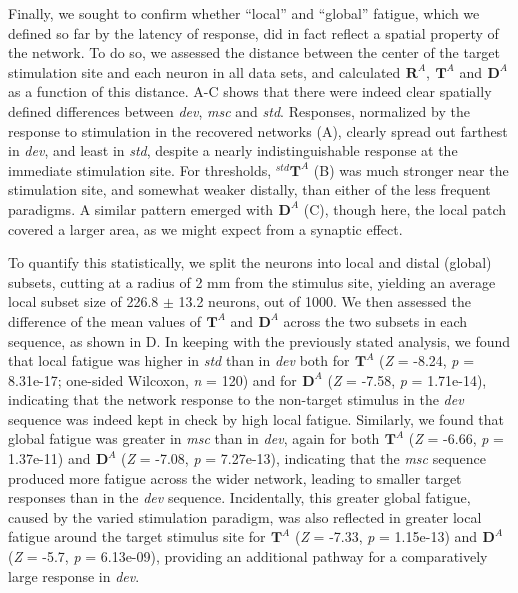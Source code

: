 \documentclass[9pt,lineno,onehalfspacing]{elife}
\newcommand{\dev}{\textit{dev}}
\newcommand{\msc}{\textit{msc}}
\newcommand{\std}{\textit{std}}
\newcommand{\R}[3][]{{}^{#1}_{}\boldsymbol R^{#2}_{#3}}
\newcommand{\T}[3][]{{}^{#1}_{}\boldsymbol T^{#2}_{#3}}
\newcommand{\D}[3][]{{}^{#1}_{}\boldsymbol D^{#2}_{#3}}
\begin{document}
Finally, we sought to confirm whether ``local'' and ``global'' fatigue, which we defined so far by the latency of response, did in fact reflect a spatial property of the network. To do so, we assessed the distance between the center of the target stimulation site and each neuron in all data sets, and calculated $\R{A}{}$, $\T{A}{}$ and $\D{A}{}$ as a function of this distance. A-C shows that there were indeed clear spatially defined differences between \dev{}, \msc{} and \std{}. Responses, normalized by the response to stimulation in the recovered networks (A), clearly spread out farthest in \dev{}, and least in \std{}, despite a nearly indistinguishable response at the immediate stimulation site. For thresholds, $\T[std]{A}{}$ (B) was much stronger near the stimulation site, and somewhat weaker distally, than either of the less frequent paradigms. A similar pattern emerged with $\D{A}{}$ (C), though here, the local patch covered a larger area, as we might expect from a synaptic effect.

To quantify this statistically, we split the neurons into local and distal (global) subsets, cutting at a radius of 2 mm from the stimulus site, yielding an average local subset size of 226.8 $\pm$ 13.2 neurons, out of 1000. We then assessed the difference of the mean values of $\T{A}{}$ and $\D{A}{}$ across the two subsets in each sequence, as shown in D. In keeping with the previously stated analysis, we found that local fatigue was higher in \std{} than in \dev{} both for $\T{A}{}$ (\textit{Z} = -8.24, \textit{p} = 8.31e-17; one-sided Wilcoxon, \textit{n} = 120) and for $\D{A}{}$ (\textit{Z} = -7.58, \textit{p} = 1.71e-14), indicating that the network response to the non-target stimulus in the \dev{} sequence was indeed kept in check by high local fatigue. Similarly, we found that global fatigue was greater in \msc{} than in \dev{}, again for both $\T{A}{}$ (\textit{Z} = -6.66, \textit{p} = 1.37e-11) and $\D{A}{}$ (\textit{Z} = -7.08, \textit{p} = 7.27e-13), indicating that the \msc{} sequence produced more fatigue across the wider network, leading to smaller target responses than in the \dev{} sequence. Incidentally, this greater global fatigue, caused by the varied stimulation paradigm, was also reflected in greater local fatigue around the target stimulus site for $\T{A}{}$ (\textit{Z} = -7.33, \textit{p} = 1.15e-13) and $\D{A}{}$ (\textit{Z} = -5.7, \textit{p} = 6.13e-09), providing an additional pathway for a comparatively large response in \dev{}.
\end{document}
